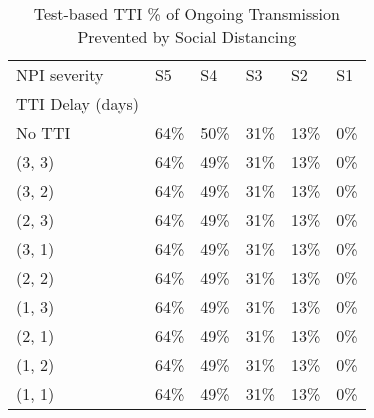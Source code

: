 \documentclass{article}
\begin{document}
    


    \begin{table}[H]
        \centering
         \begin{tabular}{llllll}
\toprule
NPI severity &    S5 &    S4 &    S3 &    S2 &   S1 \\
TTI Delay (days) &       &       &       &       &      \\
\midrule
No TTI           &  64\% &  50\% &  31\% &  13\% &  0\% \\
(3, 3)           &  64\% &  49\% &  31\% &  13\% &  0\% \\
(3, 2)           &  64\% &  49\% &  31\% &  13\% &  0\% \\
(2, 3)           &  64\% &  49\% &  31\% &  13\% &  0\% \\
(3, 1)           &  64\% &  49\% &  31\% &  13\% &  0\% \\
(2, 2)           &  64\% &  49\% &  31\% &  13\% &  0\% \\
(1, 3)           &  64\% &  49\% &  31\% &  13\% &  0\% \\
(2, 1)           &  64\% &  49\% &  31\% &  13\% &  0\% \\
(1, 2)           &  64\% &  49\% &  31\% &  13\% &  0\% \\
(1, 1)           &  64\% &  49\% &  31\% &  13\% &  0\% \\
\bottomrule
\end{tabular}

        \caption{Test-based TTI \% of Ongoing Transmission Prevented by Social Distancing}
    \end{table}
    
\end{document}
